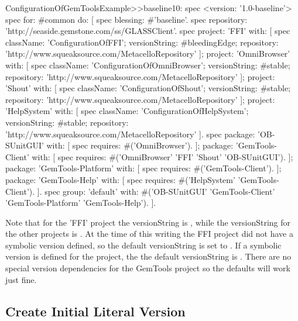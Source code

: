 \documentclass[a4paper,10pt,twoside]{book}
\begin{document}
\begin{code}{}
ConfigurationOfGemToolsExample>>baseline10: spec
  <version: '1.0-baseline'>
  spec for: #common do: [
     spec blessing: #'baseline'.
     spec repository: 'http://seaside.gemstone.com/ss/GLASSClient'.
     spec
        project: 'FFI' with: [
          spec
             className: 'ConfigurationOfFFI';
             versionString: #bleedingEdge;
             repository: 'http://www.squeaksource.com/MetacelloRepository' ];
        project: 'OmniBrowser' with: [
          spec
             className: 'ConfigurationOfOmniBrowser';
             versionString: #stable;
             repository: 'http://www.squeaksource.com/MetacelloRepository' ];
        project: 'Shout' with: [
          spec
             className: 'ConfigurationOfShout';
             versionString: #stable;
             repository: 'http://www.squeaksource.com/MetacelloRepository' ];
        project: 'HelpSystem' with: [
          spec
             className: 'ConfigurationOfHelpSystem';
             versionString: #stable;
             repository: 'http://www.squeaksource.com/MetacelloRepository' ].
     spec
        package: 'OB-SUnitGUI' with: [
          spec requires: #('OmniBrowser'). ];
        package: 'GemTools-Client' with: [
          spec requires: #('OmniBrowser' 'FFI' 'Shout' 'OB-SUnitGUI'). ];
        package: 'GemTools-Platform' with: [
          spec requires: #('GemTools-Client'). ];
        package: 'GemTools-Help' with: [
          spec requires: #('HelpSystem' 'GemTools-Client'). ].
     spec group: 'default' with: #('OB-SUnitGUI' 'GemTools-Client'
             'GemTools-Platform' 'GemTools-Help'). ].
\end{code}             



Note that for the 'FFI' project the versionString is , while the versionString for the other projects is . At the time of this writing the FFI project did not have a  symbolic version defined, so the default versionString is set to . If a  symbolic version is defined for the project, the the default versionString is . There are no special version dependencies for the GemTools project so the defaults will work just fine.



\subsection{Create Initial Literal Version}
\end{document}
